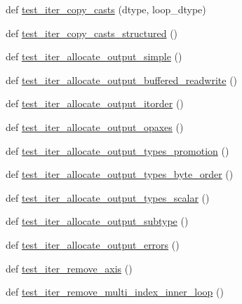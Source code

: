 \begin{DoxyCompactItemize}
\item 
def \hyperlink{namespacenumpy_1_1core_1_1tests_1_1test__nditer_accd9537e0aa7b654bb9385e36a31d0e9}{test\+\_\+iter\+\_\+copy\+\_\+casts} (dtype, loop\+\_\+dtype)
\item 
def \hyperlink{namespacenumpy_1_1core_1_1tests_1_1test__nditer_a96fea9a9b097c971bf9dfc9d3318090d}{test\+\_\+iter\+\_\+copy\+\_\+casts\+\_\+structured} ()
\item 
def \hyperlink{namespacenumpy_1_1core_1_1tests_1_1test__nditer_a0235761377024f2afd7544408fb42dc3}{test\+\_\+iter\+\_\+allocate\+\_\+output\+\_\+simple} ()
\item 
def \hyperlink{namespacenumpy_1_1core_1_1tests_1_1test__nditer_afc66e46404c164421c91f2652ea5be1c}{test\+\_\+iter\+\_\+allocate\+\_\+output\+\_\+buffered\+\_\+readwrite} ()
\item 
def \hyperlink{namespacenumpy_1_1core_1_1tests_1_1test__nditer_a7a5ca664cb798407aa57f8307ad44920}{test\+\_\+iter\+\_\+allocate\+\_\+output\+\_\+itorder} ()
\item 
def \hyperlink{namespacenumpy_1_1core_1_1tests_1_1test__nditer_affd733776030fd8413d1f73f5a88af12}{test\+\_\+iter\+\_\+allocate\+\_\+output\+\_\+opaxes} ()
\item 
def \hyperlink{namespacenumpy_1_1core_1_1tests_1_1test__nditer_a19e744b97904e0e16b7eb1b13206b300}{test\+\_\+iter\+\_\+allocate\+\_\+output\+\_\+types\+\_\+promotion} ()
\item 
def \hyperlink{namespacenumpy_1_1core_1_1tests_1_1test__nditer_a214b638d17f3cc65fc8f82c8058d0119}{test\+\_\+iter\+\_\+allocate\+\_\+output\+\_\+types\+\_\+byte\+\_\+order} ()
\item 
def \hyperlink{namespacenumpy_1_1core_1_1tests_1_1test__nditer_a06e0aa694b6162a2f3134cea429f92c2}{test\+\_\+iter\+\_\+allocate\+\_\+output\+\_\+types\+\_\+scalar} ()
\item 
def \hyperlink{namespacenumpy_1_1core_1_1tests_1_1test__nditer_a4b6faa3dbd00cb1686a118561850b333}{test\+\_\+iter\+\_\+allocate\+\_\+output\+\_\+subtype} ()
\item 
def \hyperlink{namespacenumpy_1_1core_1_1tests_1_1test__nditer_a820e09278adf33a6cba379448b393c28}{test\+\_\+iter\+\_\+allocate\+\_\+output\+\_\+errors} ()
\item 
def \hyperlink{namespacenumpy_1_1core_1_1tests_1_1test__nditer_a02c457839fe457a0af3aa155338dbd31}{test\+\_\+iter\+\_\+remove\+\_\+axis} ()
\item 
def \hyperlink{namespacenumpy_1_1core_1_1tests_1_1test__nditer_a18497742866bcd075305f1d16ca36d9a}{test\+\_\+iter\+\_\+remove\+\_\+multi\+\_\+index\+\_\+inner\+\_\+loop} ()

\end{DoxyCompactItemize}
